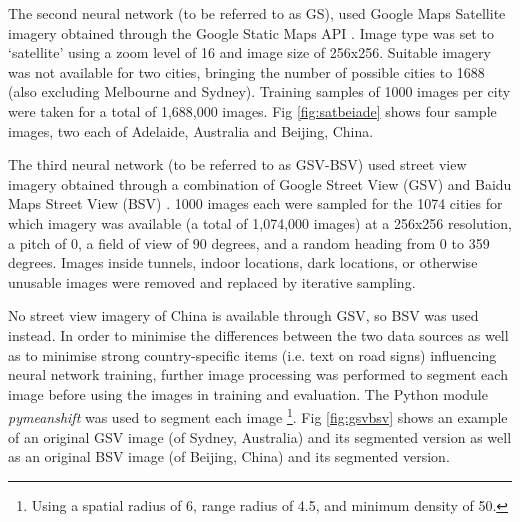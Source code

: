 \documentclass[10pt,letterpaper]{article}
\begin{document}
%

The second neural network (to be referred to as GS), used Google Maps Satellite imagery obtained through the Google Static Maps API \cite{GoogleStatic2017}. Image type was set to `satellite' using a zoom level of 16 and image size of 256x256. Suitable imagery was not available for two cities, bringing the number of possible cities to 1688 (also excluding Melbourne and Sydney). Training samples of 1000 images per city were taken for a total of 1,688,000 images. Fig \ref{fig:satbeiade} shows four sample images, two each of Adelaide, Australia and Beijing, China. 



The third neural network (to be referred to as GSV-BSV) used street view imagery obtained through a combination of Google Street View (GSV) \cite{GoogleMaps2017b} and Baidu Maps Street View (BSV) \cite{Baidu2017}. 1000 images each were sampled for the 1074 cities for which imagery was available (a total of 1,074,000 images) at a 256x256 resolution, a pitch of 0, a field of view of 90 degrees, and a random heading from 0 to 359 degrees. Images inside tunnels, indoor locations, dark locations, or otherwise unusable images were removed and replaced by iterative sampling.

No street view imagery of China is available through GSV, so BSV was used instead.  In order to minimise the differences between the two data sources as well as to minimise strong country-specific items (i.e. text on road signs) influencing neural network training, further image processing was performed to segment each image before using the images in training and evaluation. The Python module \textit{pymeanshift} \cite{Pymeanshift2017} was used to segment each image \footnote{Using a spatial radius of 6, range radius of 4.5, and minimum density of 50.}. Fig \ref{fig:gsvbsv} shows an example of an original GSV image (of Sydney, Australia) and its segmented version as well as an original BSV image (of Beijing, China) and its segmented version.
\end{document}

